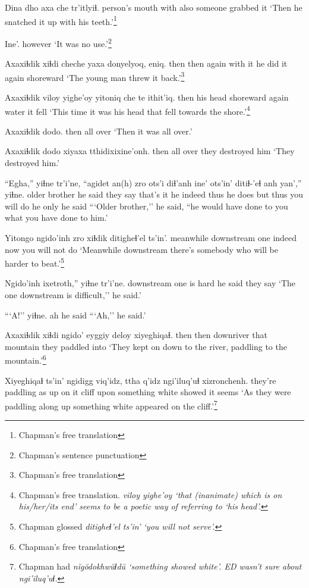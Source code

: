 \documentclass[12pt]{article}
\begin{document}
\gll Dina dho axa che tr'itlyiɬ.
person's mouth with also {someone grabbed it}
\glt `Then he snatched it up with his teeth.'\footnote{Chapman's free translation}
\glend

\gll Ine'.
however
\glt `It was no use.'\footnote{Chapman's sentence punctuation}
\glend

\gll Axaxiɬdik xiɬdi cheche yaxa donyelyoq, eniq.
then  then again {with it} {he did it again} shoreward
\glt `The young man threw it back.'\footnote{Chapman's free translation}
\glend

\gll Axaxiɬdik {viloy yighe'oy} yitoniq che te ithit'iq.
then {his head} shoreward again water {it fell}
\glt `This time it was his head that fell towards the shore.'\footnote{Chapman's free translation. \em viloy yighe'oy \em `that (inanimate) which is on his/her/its end' seems to be a poetic way of referring to `his head'.}
\glend

\gll Axaxiɬdik dodo.
then  {all over}
\glt `Then it was all over.'
\glend

\gll Axaxiɬdik dodo  {xiyaxa tthidixixine'onh.}
then  {all over} {they destroyed him}
\glt `They destroyed him.'
\glend

\gll ``Egha,'' yiɬne  tr'i'ne, ``agidet an(h) zro ots'i diɬ'anh ine' ots'in' ditiɬ-'eɬ anh yan','' yiɬne.
{older brother} {he said} {they say} {that's it}  he indeed thus {he does} but thus {you will do} he only  {he said}
\glt ```Older brother,'' he said, ``he would have done to you what you have done to him.'
\glend

\gll Yitongo ngido'inh zro xiɬdik {ditigheɬ'el ts'in'.}
meanwhile {downstream one} indeed now {you will not do}
\glt `Meanwhile downstream there's somebody who will be harder to beat.'\footnote{Chapman glossed \em ditigheɬ'el ts'in' \em `you will not serve'.}
\glend

\gll Ngido'inh ixetroth,'' yiɬne  tr'i'ne.
{downstream one} {is hard} {he said} {they say}
\glt `The one downstream is difficult,'' he said.'
\glend

\gll ```A!'' yiɬne.
ah {he said}
\glt ```Ah,'' he said.'
\glend

\gll Axaxiɬdik xiɬdi ngido'  eyggiy deloy  xiyeghiqaɬ.
then  then downriver that  mountain {they paddled into}
\glt `They kept on down to the river, paddling to the mountain.'\footnote{Chapman's free translation}
\glend

\gll Xiyeghiqaɬ ts'in' ngidigg viq'idz, ttha q'idz ngi'iluq'uɬ   xizronchenh.
{they're paddling} as up {on it} cliff upon {something white showed} {it seems}
\glt `As they were paddling along up something white appeared on the cliff.'\footnote{Chapman had \em n\u{i}g\u{o}dokhw\u{u}ɬd\u{u} \em `something showed white'. ED wasn't sure about \em ngi'iluq'uɬ.}
\glend
\end{document}
